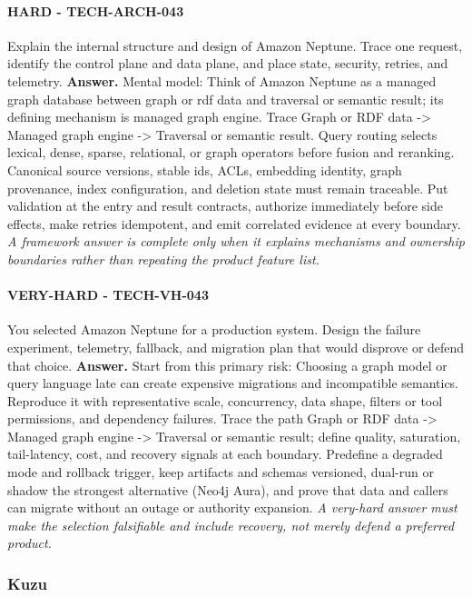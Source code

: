 \paragraph{HARD - TECH-ARCH-043} Explain the internal structure and design of Amazon Neptune. Trace one request, identify the control plane and data plane, and place state, security, retries, and telemetry.
\textbf{Answer.} Mental model: Think of Amazon Neptune as a managed graph database between graph or rdf data and traversal or semantic result; its defining mechanism is managed graph engine. Trace Graph or RDF data -> Managed graph engine -> Traversal or semantic result. Query routing selects lexical, dense, sparse, relational, or graph operators before fusion and reranking. Canonical source versions, stable ids, ACLs, embedding identity, graph provenance, index configuration, and deletion state must remain traceable. Put validation at the entry and result contracts, authorize immediately before side effects, make retries idempotent, and emit correlated evidence at every boundary.
\textit{A framework answer is complete only when it explains mechanisms and ownership boundaries rather than repeating the product feature list.}
\paragraph{VERY-HARD - TECH-VH-043} You selected Amazon Neptune for a production system. Design the failure experiment, telemetry, fallback, and migration plan that would disprove or defend that choice.
\textbf{Answer.} Start from this primary risk: Choosing a graph model or query language late can create expensive migrations and incompatible semantics. Reproduce it with representative scale, concurrency, data shape, filters or tool permissions, and dependency failures. Trace the path Graph or RDF data -> Managed graph engine -> Traversal or semantic result; define quality, saturation, tail-latency, cost, and recovery signals at each boundary. Predefine a degraded mode and rollback trigger, keep artifacts and schemas versioned, dual-run or shadow the strongest alternative (Neo4j Aura), and prove that data and callers can migrate without an outage or authority expansion.
\textit{A very-hard answer must make the selection falsifiable and include recovery, not merely defend a preferred product.}
\subsubsection*{Kuzu}
